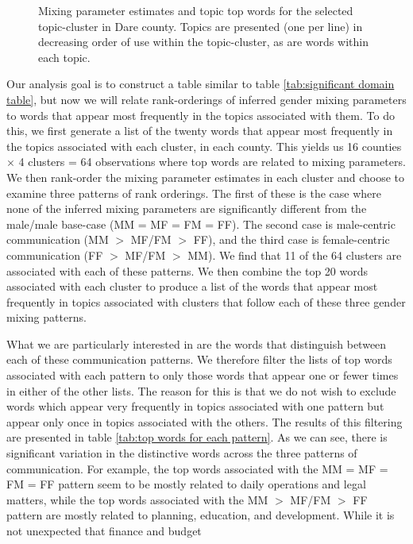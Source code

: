 \documentclass{pnastwo}
\begin{document}
\begin{article}
\begin{figure}
\begin{tabular}{m{}}
	\end{tabular}
	\caption{\label{tab: hoke 3 mp} Mixing parameter estimates and topic top words for the selected topic-cluster in Dare county. Topics are presented (one per line) in decreasing order of use within the topic-cluster, as are words within each topic.}
\end{figure}

Our analysis goal is to construct a table similar to table \ref{tab:significant domain table}, but now we will relate rank-orderings of inferred gender mixing parameters to words that appear most frequently in the topics associated with them. To do this, we first generate a list of the twenty words that appear most frequently in the topics associated with each cluster, in each county. This yields us 16 counties $\times$ 4 clusters = 64 observations where top words are related to mixing parameters. We then rank-order the mixing parameter estimates in each cluster and choose to examine three patterns of rank orderings. The first of these is the case where none of the inferred mixing parameters are significantly different from the male/male base-case (MM = MF = FM = FF). The second case is male-centric communication (MM $>$ MF/FM $>$ FF), and the third case is female-centric communication (FF $>$ MF/FM $>$ MM). We find that 11 of the 64 clusters are associated with each of these patterns. We then combine the top 20 words associated with each cluster to produce a list of the words that appear most frequently in topics associated with clusters that follow each of these three gender mixing patterns. 

What we are particularly interested in are the words that distinguish between each of these communication patterns. We therefore filter the lists of top words associated with each pattern to only those words that appear one or fewer times in either of the other lists. The reason for this is that we do not wish to exclude words which appear very frequently in topics associated with one pattern but appear only once in topics associated with the others. The results of this filtering are presented in table \ref{tab:top words for each pattern}. As we can see, there is significant variation in the distinctive words across the three patterns of communication. For example, the top words associated with the MM = MF = FM = FF pattern seem to be mostly related to daily operations and legal matters, while the top words associated with the MM $>$ MF/FM $>$ FF pattern are mostly related to planning, education, and development. While it is not unexpected that finance and budget


\end{article}
\end{document}
